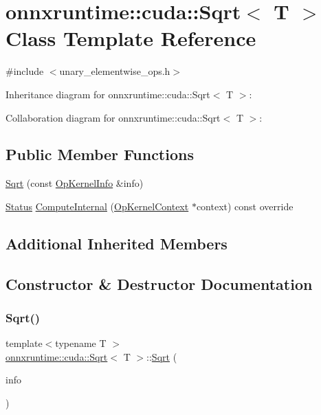 \hypertarget{classonnxruntime_1_1cuda_1_1Sqrt}{}\section{onnxruntime\+:\+:cuda\+:\+:Sqrt$<$ T $>$ Class Template Reference}
\label{classonnxruntime_1_1cuda_1_1Sqrt}


{\ttfamily \#include $<$unary\+\_\+elementwise\+\_\+ops.\+h$>$}



Inheritance diagram for onnxruntime\+:\+:cuda\+:\+:Sqrt$<$ T $>$\+:


Collaboration diagram for onnxruntime\+:\+:cuda\+:\+:Sqrt$<$ T $>$\+:
\subsection*{Public Member Functions}
\begin{DoxyCompactItemize}
\item 
\mbox{\hyperlink{classonnxruntime_1_1cuda_1_1Sqrt_a0565ae84ac8dd9bbda00c950ab29dddd}{Sqrt}} (const \mbox{\hyperlink{classonnxruntime_1_1OpKernelInfo}{Op\+Kernel\+Info}} \&info)
\item 
\mbox{\hyperlink{classonnxruntime_1_1common_1_1Status}{Status}} \mbox{\hyperlink{classonnxruntime_1_1cuda_1_1Sqrt_a8bc2beeaa3b9aecd40e1ad87a118b723}{Compute\+Internal}} (\mbox{\hyperlink{classonnxruntime_1_1OpKernelContext}{Op\+Kernel\+Context}} $\ast$context) const override
\end{DoxyCompactItemize}
\subsection*{Additional Inherited Members}


\subsection{Constructor \& Destructor Documentation}
\mbox{\label{classonnxruntime_1_1cuda_1_1Sqrt_a0565ae84ac8dd9bbda00c950ab29dddd}} 
\subsubsection{\texorpdfstring{Sqrt()}{Sqrt()}}
{\footnotesize\ttfamily template$<$typename T $>$ \\
\mbox{\hyperlink{classonnxruntime_1_1cuda_1_1Sqrt}{onnxruntime\+::cuda\+::\+Sqrt}}$<$ T $>$\+::\mbox{\hyperlink{classonnxruntime_1_1cuda_1_1Sqrt}{Sqrt}} (\begin{DoxyParamCaption}\item[{const \mbox{\hyperlink{classonnxruntime_1_1OpKernelInfo}{Op\+Kernel\+Info}} \&}]{info }\end{DoxyParamCaption})\hspace{0.3cm}{\ttfamily [inline]}}



